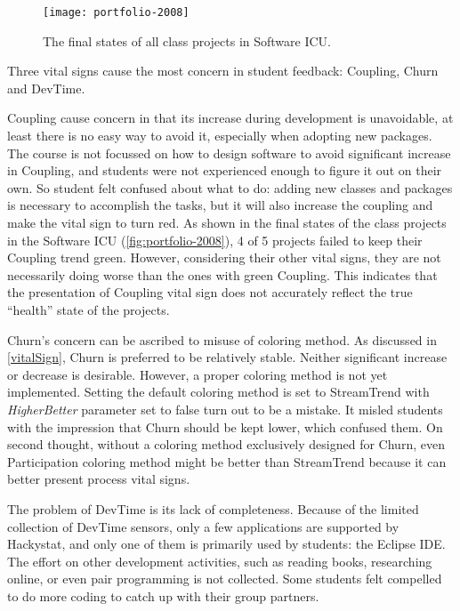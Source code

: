 \begin{figure}[htbp] %
   \centering
   \texttt{[image: portfolio-2008]} 
   \caption{The final states of all class projects in Software ICU.}
   \label{fig:portfolio-2008}
\end{figure}

Three vital signs cause the most concern in student feedback: Coupling, Churn and DevTime.

Coupling cause concern in that its increase during development is unavoidable, at least there is no easy way to avoid it, especially when adopting new packages. The course is not focussed on how to design software to avoid significant increase in Coupling, and students were not experienced enough to figure it out on their own. So student felt confused about what to do: adding new classes and packages is necessary to accomplish the tasks, but it will also increase the coupling and make the vital sign to turn red. As shown in the final states of the class projects in the Software ICU (\autoref{fig:portfolio-2008}), 4 of 5 projects failed to keep their Coupling trend green. However, considering their other vital signs, they are not necessarily doing worse than the ones with green Coupling. This indicates that the presentation of Coupling vital sign does not accurately reflect the true ``health'' state of the projects.  

Churn's concern can be ascribed to misuse of coloring method. As discussed in \autoref{vitalSign}, Churn is preferred to be relatively stable. Neither significant increase or decrease is desirable. However, a proper coloring method is not yet implemented. Setting the default coloring method is set to StreamTrend with {\it HigherBetter} parameter set to false turn out to be a mistake. It misled students with the impression that Churn should be kept lower, which confused them. On second thought, without a coloring method exclusively designed for Churn, even Participation coloring method might be better than StreamTrend because it can better present process vital signs.

The problem of DevTime is its lack of completeness. Because of the limited collection of DevTime sensors, only a few applications are supported by Hackystat, and only one of them is primarily used by students: the Eclipse IDE. The effort on other development activities, such as reading books, researching online, or even pair programming is not collected. Some students felt compelled to do more coding to catch up with their group partners.


